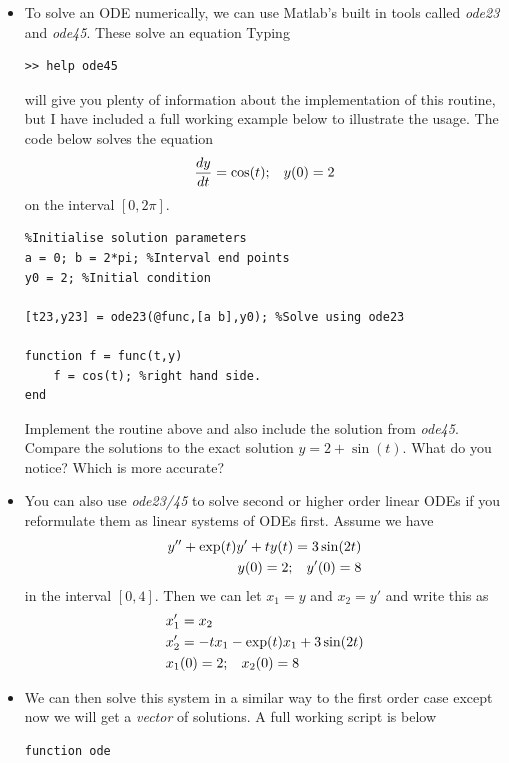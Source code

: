 \documentclass[12pt]{report}
\begin{document}
\begin{itemize}
\item To solve an ODE numerically, we can use Matlab's built in tools called \textit{ode23} and \textit{ode45}. These solve an equation Typing
\begin{lstlisting}
>> help ode45
\end{lstlisting}
will give you plenty of information about the implementation of this routine, but I have included a full working example below to illustrate the usage. The code below solves the equation 
\begin{displaymath}
\frac{dy}{dt} = \cos(t); \hspace{3mm} y(0) = 2
\end{displaymath}
on the interval $[0, 2\pi]$.
\begin{lstlisting}
%Initialise solution parameters
a = 0; b = 2*pi; %Interval end points
y0 = 2; %Initial condition

[t23,y23] = ode23(@func,[a b],y0); %Solve using ode23

function f = func(t,y)
    f = cos(t); %right hand side.
end
\end{lstlisting}

\begin{tcolorbox}[title=Task]
Implement the routine above and also include the solution from \textit{ode45}. Compare the solutions to the exact solution $y = 2 + \sin(t)$. What do you notice? Which is more accurate?
\end{tcolorbox}

\item You can also use \textit{ode23/45} to solve second or higher order linear ODEs if you reformulate them as linear systems of ODEs first. Assume we have
\begin{align*}
y'' + \exp(t)y' + ty(t) = 3\sin(2t) \\
y(0) = 2; \hspace{3mm} y'(0) = 8
\end{align*}
in the interval $[0, 4]$. Then we can let $x_1 = y$ and $x_2 = y'$ and write this as 
\begin{align*}
x_1' &= x_2 \\
x_2' &=  -tx_1 - \exp(t)x_1 + 3\sin(2t) \\
x_1&(0) = 2; \hspace{3mm} x_2(0) = 8
\end{align*}
\item We can then solve this system in a similar way to the first order case except now we will get a \textit{vector} of solutions. A full working script is below
\begin{lstlisting}
function ode


\end{lstlisting}
\end{itemize}
\end{document}
